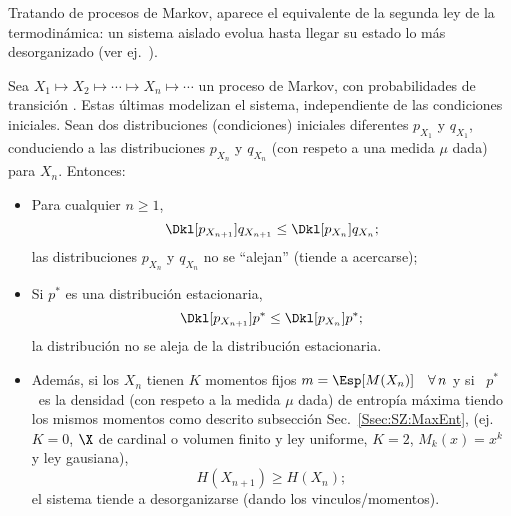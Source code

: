 
\label{Ssec:SZ:SecLeyTermo}

Tratando de procesos  de Markov, aparece el equivalente de la  segunda ley de la
termodin\'amica:  un sistema  aislado evolua  hasta  llegar su  estado lo  m\'as
desorganizado (ver ej.~\cite[y ref.]{CovTho06, Mer10, Mer18}).

\begin{lema}
  Sea $X_1 \mapsto X_2 \mapsto \cdots  \mapsto X_n \mapsto \cdots$ un proceso de
  Markov, con probabilidades  de transici\'on .  Estas \'ultimas modelizan
  el   sistema,  independiente   de   las  condiciones   iniciales.   Sean   dos
  distribuciones  (condiciones)  iniciales  diferentes  $p_{X_1}$  y  $q_{X_1}$,
  conduciendo  a las  distribuciones $p_{X_n}$  y $q_{X_n}$  (con respeto  a una
  medida $\mu$ dada) para $X_n$. Entonces:
%
\begin{itemize}
\item  Para cualquier  $n \ge  1$,
  \[
  \Dkl[p_{X_{n+1}}]{q_{X_{n+1}}} \le \Dkl[p_{X_n}]{q_{X_n}};
  \]
  las  distribuciones   $p_{X_n}$  y  $q_{X_n}$  no  se   ``alejan''  (tiende  a
  acercarse);
%
\item  Si  $p^*$  es  una  distribuci\'on  estacionaria,
  \[
  \Dkl[p_{X_{n+1}}]{p^*} \le \Dkl[p_{X_n}]{p^*};
  \]
  la distribuci\'on no se aleja de la distribuci\'on estacionaria.
%
\item Adem\'as, si  los $X_n$ tienen $K$ momentos fijos  $m = \Esp[M(X_n)] \quad
  \forall \,  n$ y si \  $p^*$ \ es la  densidad (con respeto a  la medida $\mu$
  dada)  de  entrop\'ia  m\'axima  tiendo  los  mismos  momentos  como  descrito
  subsecci\'on  Sec.~\ref{Ssec:SZ:MaxEnt}, (ej.   $K =  0$, $\X$  de  cardinal o
  volumen finito y ley uniforme, $K = 2$, $M_k(x) = x^k$ y ley gausiana),
  \[
  H(X_{n+1}) \ge H(X_n);
  \]
  el  sistema   tiende  a  desorganizarse (dando los vinculos/momentos).
\end{itemize}
\end{lema}
%
